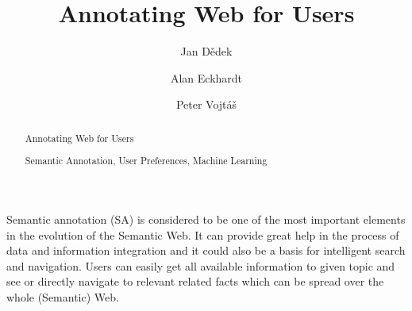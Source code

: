\documentclass[runningheads,a4paper]{llncs}
\newcommand{\keywords}[1]{\par\addvspace\baselineskip
\noindent\keywordname\enspace\ignorespaces#1}
\begin{document}
\mainmatter  %

\title{Annotating Web for Users}


%
%
\author{Jan D\v{e}dek \and Alan Eckhardt \and Peter Vojt\'{a}\v{s}}
%


%
%

\maketitle


\begin{abstract}
Annotating Web for Users
\keywords{Semantic Annotation, User Preferences, Machine Learning}
\end{abstract}


Semantic annotation (SA) is considered to be one of the most important elements in the evolution of the Semantic Web. It can provide great help in the process of data and information integration and it could also be a basis for intelligent search and navigation. Users can easily get all available information to given topic and see or directly navigate to relevant related facts which can be spread over the whole (Semantic) Web.
\end{document}

